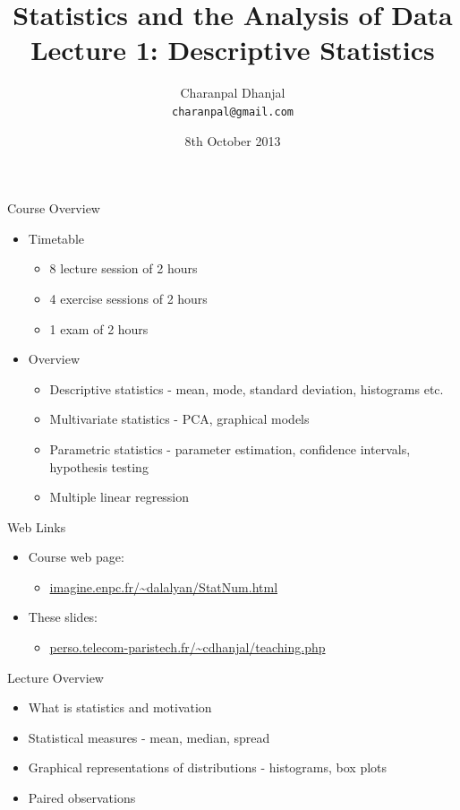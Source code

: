 \documentclass{beamer}
\title{Statistics and the Analysis of Data\\ Lecture 1: Descriptive Statistics}
\author{Charanpal Dhanjal \\ \texttt{charanpal@gmail.com}}
\institute{\'{E}cole des Ponts}
\date{8th October 2013}
\begin{document}
\frame{\titlepage}

\begin{frame}{Course Overview}
\begin{itemize}
\item Timetable 
\begin{itemize}
\item 8 lecture session of 2 hours
\item 4 exercise sessions of 2 hours
\item 1 exam of 2 hours 
\end{itemize}
\item Overview
\begin{itemize} 
\item Descriptive statistics - mean, mode, standard deviation, histograms etc. 
\item Multivariate statistics - PCA, graphical models
\item Parametric statistics - parameter estimation, confidence intervals, hypothesis testing    
\item Multiple linear regression 
\end{itemize}
\end{itemize}
\end{frame}

\begin{frame}{Web Links}  
\begin{itemize}
 \item Course web page: 
\begin{itemize}	
  \item \url{imagine.enpc.fr/~dalalyan/StatNum.html}
 \end{itemize}
 \item These slides:
 \begin{itemize}
  \item \url{perso.telecom-paristech.fr/~cdhanjal/teaching.php} 
  \end{itemize}
\end{itemize}
\end{frame}


\begin{frame}{Lecture Overview}
\begin{itemize} 
 \item What is statistics and motivation
\item Statistical measures - mean, median, spread 
\item Graphical representations of distributions - histograms, box plots 
\item Paired observations  
\end{itemize}
\end{frame}
\end{document}
